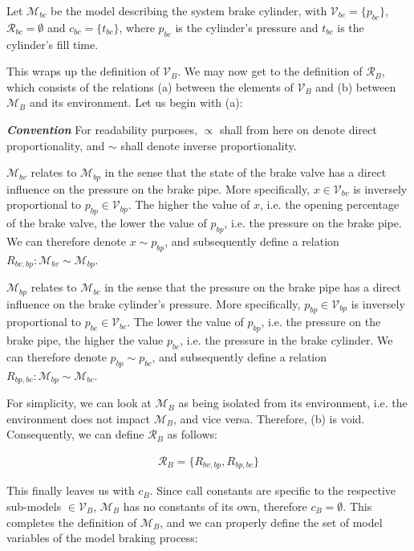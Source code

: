 \noindent
Let ${\mathcal {M}}_{bc}$ be the model describing the system brake cylinder, with ${\mathcal {V}}_{bc} = \{ p_{bc} \}$, ${\mathcal {R}}_{bc} = \emptyset$ and $c_{bc} = \{ t_{bc} \}$, where $p_{bc}$ is the cylinder's pressure and $t_{bc}$ is the cylinder's fill time.
\bigskip
\par\noindent
This wraps up the definition of ${\mathcal{V}}_{B}$. We may now get to the definition of ${\mathcal{R}}_{B}$, which consists of the relations (a) between the elements of ${\mathcal{V}}_{B}$ and (b) between ${\mathcal{M}}_{B}$ and its environment. Let us begin with (a):
\bigskip
\par\noindent
\textit{\textbf{Convention}} For readability purposes, $\propto$ shall from here on denote direct proportionality, and $\sim$ shall denote inverse proportionality.
\bigskip
\par
${\mathcal{M}}_{bv}$ relates to ${\mathcal{M}}_{bp}$ in the sense that the state of the brake valve has a direct influence on the pressure on the brake pipe. More specifically, $x \in {\mathcal{V}}_{bv}$ is inversely proportional to $p_{bp} \in {\mathcal{V}}_{bp}$. The higher the value of $x$, i.e. the opening percentage of the brake valve, the lower the value of $p_{bp}$, i.e. the pressure on the brake pipe. We can therefore denote $x \sim p_{bp}$, and subsequently define a relation $R_{bv,bp}: {\mathcal{M}}_{bv} \sim {\mathcal{M}}_{bp}$. 
\par
${\mathcal{M}}_{bp}$ relates to ${\mathcal{M}}_{bc}$ in the sense that the pressure on the brake pipe has a direct influence on the brake cylinder's pressure. More specifically, $p_{bp} \in {\mathcal{V}}_{bp}$ is inversely proportional to $p_{bc} \in {\mathcal{V}}_{bc}$. The lower the value of $p_{bp}$, i.e. the pressure on the brake pipe, the higher the value $p_{bc}$, i.e. the pressure in the brake cylinder. We can therefore denote $p_{bp} \sim p_{bc}$, and subsequently define a relation $R_{bp,bc}: {\mathcal{M}}_{bp} \sim {\mathcal{M}}_{bc}$.
\par
For simplicity, we can look at ${\mathcal{M}}_{B}$ as being isolated from its environment, i.e. the environment does not impact ${\mathcal{M}}_{B}$, and vice versa. Therefore, (b) is void. Consequently, we can define ${\mathcal{R}}_{B}$ as follows:

\begin{align*}
{\mathcal{R}}_{B} = \{ R_{bv,bp}, R_{bp,bc} \}
\end{align*}

\noindent
This finally leaves us with $c_{B}$. Since call constants are specific to the respective sub-models $\in {\mathcal{V}}_{B}$, ${\mathcal{M}}_{B}$ has no constants of its own, therefore $c_{B} = \emptyset$. This completes the definition of ${\mathcal{M}}_{B}$, and we can properly define the set of model variables of the model braking process:

